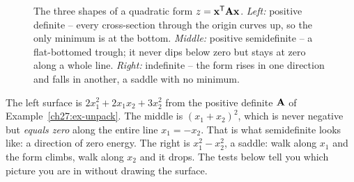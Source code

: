 \begin{figure}[htbp]
\centering
{}\hfill
{}\hfill
{}
\caption{The three shapes of a quadratic form $z=\mathbf{x}^{\mathsf{T}}\mathbf{A}\mathbf{x}$. \emph{Left:} positive
definite -- every cross-section through the origin curves up, so the only minimum is at the bottom.
\emph{Middle:} positive semidefinite -- a flat-bottomed trough; it never dips below zero but stays at
zero along a whole line. \emph{Right:} indefinite -- the form rises in one direction and falls in
another, a saddle with no minimum.}
\label{ch27:fig-three-surfaces}
\end{figure}

The left surface is $2x_1^2 + 2x_1x_2 + 3x_2^2$ from the positive definite $\mathbf{A}$ of
Example~\ref{ch27:ex-unpack}. The middle is
$(x_1+x_2)^2$, which is never negative but \emph{equals zero} along the entire line $x_1 = -x_2$.
That is what semidefinite looks like: a direction of zero energy. The right is $x_1^2 - x_2^2$, a
saddle: walk along $x_1$ and the form climbs, walk along $x_2$ and it drops. The tests below tell
you which picture you are in without drawing the surface.

